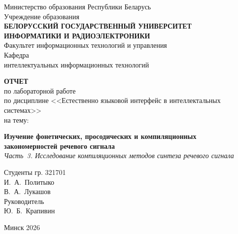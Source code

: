 \begin{titlepage}
	\centering
	\begin{minipage}{0.9\textwidth}
		\centering
		Министерство образования Республики Беларусь\\
		Учреждение образования\\
		{\large \textbf{БЕЛОРУССКИЙ ГОСУДАРСТВЕННЫЙ УНИВЕРСИТЕТ}}\\
		\textbf{ИНФОРМАТИКИ И РАДИОЭЛЕКТРОНИКИ}\\
		Факультет информационных технологий и управления\\
		Кафедра\\
		интеллектуальных информационных технологий
	\end{minipage}

	\vspace{3cm}

	{\large \textbf{ОТЧЕТ}}\\[0.3em]
	{\large по лабораторной работе}\\[0.3em]
	{\large по дисциплине <<Естественно языковой интерфейс в интеллектальных
	системах>>}\\[2em]
	на тему:

	\textbf{\large Изучение фонетических, просодических и компиляционных
	закономерностей речевого сигнала}\\[0.3em]
	{\large\itshape Часть~3. Исследование компиляционных методов синтеза
	речевого сигнала}\\[1em]

	\begin{flushright}
		\begin{minipage}{0.5\textwidth}
			Студенты гр. 321701\\
			\hfill И.~А.~Политыко\\
			\hfill В.~А.~Лукашов\\[1em]
			Руководитель\\
			\hfill Ю.~Б.~Крапивин
		\end{minipage}
	\end{flushright}

	\vfill
	{\large Минск 2026}
\end{titlepage}
